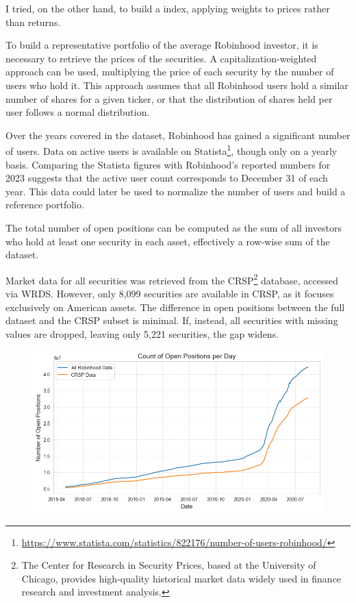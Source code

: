 I tried, on the other hand, to build a index, applying weights to prices rather than returns.  



To build a representative portfolio of the average Robinhood investor, it is necessary to retrieve the prices of the securities. 
A capitalization-weighted approach can be used, multiplying the price of each security by the number of users who hold it. 
This approach assumes that all Robinhood users hold a similar number of shares for a given ticker, or that the distribution of shares held per user follows a normal distribution.  

Over the years covered in the dataset, Robinhood has gained a significant number of users. Data on active users is available on Statista\footnote{\url{https://www.statista.com/statistics/822176/number-of-users-robinhood/}}, though only on a yearly basis. 
Comparing the Statista figures with Robinhood's reported numbers for 2023 suggests that the active user count corresponds to December 31 of each year. 
This data could later be used to normalize the number of users and build a reference portfolio.  

The total number of open positions can be computed as the sum of all investors who hold at least one security in each asset, effectively a row-wise sum of the dataset.  

Market data for all securities was retrieved from the CRSP\footnote{The Center for Research in Security Prices, based at the University of Chicago, provides high-quality historical market data widely used in finance research and investment analysis.} database, accessed via WRDS. However, only 8,099 securities are available in CRSP, as it focuses exclusively on American assets. The difference in open positions between the full dataset and the CRSP subset is minimal. If, instead, all securities with missing values are dropped, leaving only 5,221 securities, the gap widens.

\begin{figure}[h!]
        \centering
        \includegraphics[width=0.8\linewidth]{../images/no_positions_vs_date_drop.png}
\end{figure}

